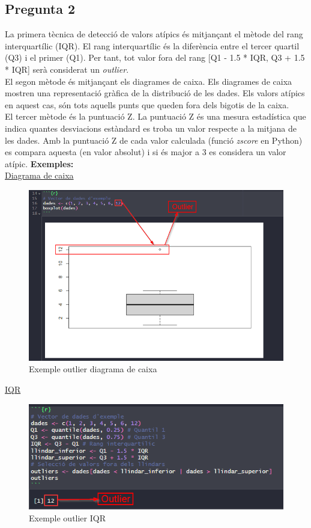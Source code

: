 \documentclass[a4paper,12pt]{report}
\begin{document}
\subsection*{Pregunta 2}
La primera tècnica de detecció de valors atípics és mitjançant el mètode del rang interquartílic (IQR). El rang interquartílic és la diferència entre el tercer quartil (Q3) i el primer (Q1). Per tant, tot valor fora del rang [Q1 - 1.5 * IQR, Q3 + 1.5 * IQR] serà considerat un \textit{outlier}.\\
El segon mètode és mitjançant els diagrames de caixa. Els diagrames de caixa mostren una representació gràfica de la distribució de les dades. Els valors atípics en aquest cas, són tots aquells punts que queden fora dels bigotis de la caixa.\\
El tercer mètode és la puntuació Z. La puntuació Z és una mesura estadística que indica quantes desviacions estàndard es troba un valor respecte a la mitjana de les dades. Amb la puntuació Z de cada valor calculada (funció \textit{zscore} en Python) es compara aquesta (en valor absolut) i si és major a 3 es considera un valor atípic.
\newpage
\textbf{Exemples:}\\
\underline{Diagrama de caixa}\\
\begin{figure}[h]
    \centering
    \includegraphics[scale=0.8]{images/boxplot.png}
    \caption{Exemple outlier diagrama de caixa}
    \label{fig:boxplot}
\end{figure}
\underline{IQR}\\
\begin{figure}[h]
    \centering
    \includegraphics[scale=1]{images/iqr.png}
    \caption{Exemple outlier IQR}
    \label{fig:iqr}
\end{figure}
\end{document}
